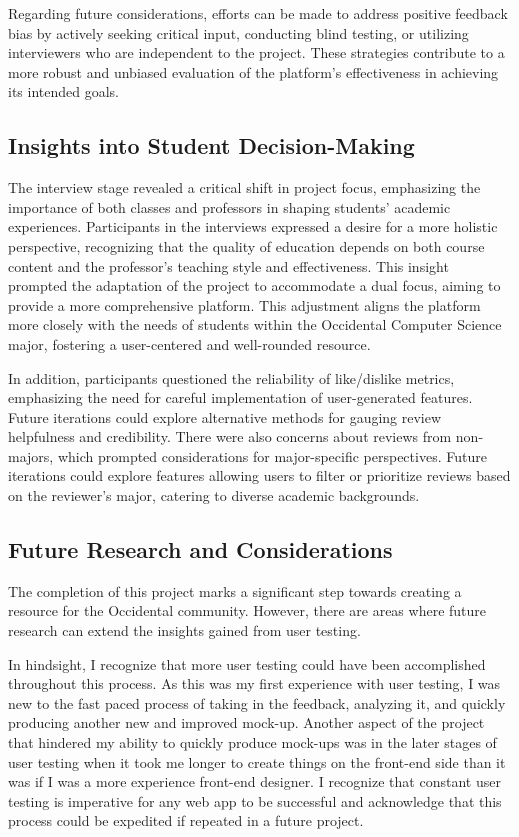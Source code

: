 \documentclass[10pt,twocolumn]{article}
\begin{document}
Regarding future considerations, efforts can be made to address positive feedback bias by actively seeking critical input, conducting blind testing, or utilizing interviewers who are independent to the project. These strategies contribute to a more robust and unbiased evaluation of the platform's effectiveness in achieving its intended goals.


\subsection{Insights into Student Decision-Making}

The interview stage revealed a critical shift in project focus, emphasizing the importance of both classes and professors in shaping students' academic experiences. Participants in the interviews expressed a desire for a more holistic perspective, recognizing that the quality of education depends on both course content and the professor's teaching style and effectiveness. This insight prompted the adaptation of the project to accommodate a dual focus, aiming to provide a more comprehensive platform. This adjustment aligns the platform more closely with the needs of students within the Occidental Computer Science major, fostering a user-centered and well-rounded resource.
 
In addition, participants questioned the reliability of like/dislike metrics, emphasizing the need for careful implementation of user-generated features. Future iterations could explore alternative methods for gauging review helpfulness and credibility. There were also concerns about reviews from non-majors, which prompted considerations for major-specific perspectives. Future iterations could explore features allowing users to filter or prioritize reviews based on the reviewer's major, catering to diverse academic backgrounds.

\subsection{Future Research and Considerations}

The completion of this project marks a significant step towards creating a resource for the Occidental community. However, there are areas where future research can extend the insights gained from user testing.

In hindsight, I recognize that more user testing could have been accomplished throughout this process. As this was my first experience with user testing, I was new to the fast paced process of taking in the feedback, analyzing it, and quickly producing another new and improved mock-up. Another aspect of the project that hindered my ability to quickly produce mock-ups was in the later stages of user testing when it took me longer to create things on the front-end side than it was if I was a more experience front-end designer. I recognize that constant user testing is imperative for any web app to be successful and acknowledge that this process could be expedited if repeated in a future project.
\end{document}
